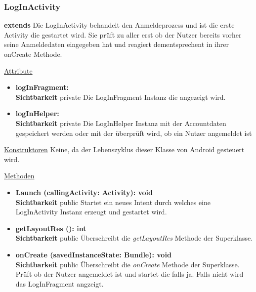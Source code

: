 \subsubsection{LogInActivity} \label{app:klasse:LogInActivity}
\textbf{extends} \newline
Die LogInActivity behandelt den Anmeldeprozess und ist die erste Activity die gestartet wird. Sie prüft zu aller erst ob der Nutzer bereits vorher seine Anmeldedaten eingegeben hat und reagiert dementsprechent in ihrer onCreate Methode.
\newline

\underline{Attribute}
\begin{itemize}
\itemsep0pt
\item \textbf{logInFragment: } \hfill\\ 
\textbf{Sichtbarkeit} private\newline
Die LogInFragment Instanz die angezeigt wird.

\item \textbf{logInHelper: } \hfill\\ 
\textbf{Sichtbarkeit} private\newline
Die LogInHelper Instanz mit der Accountdaten gespeichert werden oder mit der überprüft wird, ob ein Nutzer angemeldet ist

\end{itemize}

\underline{Konstruktoren}\newline
\indent Keine, da der Lebenszyklus dieser Klasse von Android gesteuert wird.\newline

\underline{Methoden}
\begin{itemize}
\itemsep0pt

\item \textbf{Launch (callingActivity: Activity): void}\hfill\\
\textbf{Sichtbarkeit} public
Startet ein neues Intent durch welches eine LogInActivity Instanz erzeugt und gestartet wird.

\item \textbf{getLayoutRes (): int}\hfill\\
\textbf{Sichtbarkeit} public\newline
Überschreibt die \textit{getLayoutRes} Methode der Superklasse.

\item \textbf{onCreate (savedInstanceState: Bundle): void}\hfill\\
\textbf{Sichtbarkeit} public\newline
Überschreibt die \textit{onCreate} Methode der Superklasse. Prüft ob der Nutzer angemeldet ist und startet die  falls ja. Falls nicht wird das LogInFragment angzeigt.

\end{itemize}
